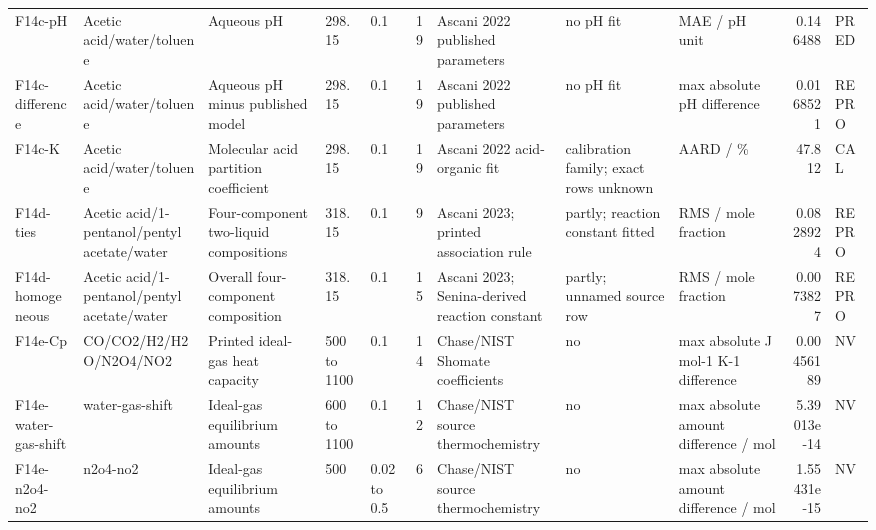 \begin{landscape}
\begin{longtable}{L{1.9cm}L{2.5cm}L{2.1cm}L{1.6cm}L{1.6cm}rL{2.4cm}L{1.9cm}L{2.2cm}rL{1cm}}
F14c-\allowbreak{}pH & Acetic acid/\allowbreak{}water/\allowbreak{}toluene & Aqueous pH & 298.15 & 0.1 & 19 & Ascani 2022 published parameters & no pH fit & MAE /\allowbreak{} pH unit & 0.146488 & PRED \\
F14c-\allowbreak{}difference & Acetic acid/\allowbreak{}water/\allowbreak{}toluene & Aqueous pH minus published model & 298.15 & 0.1 & 19 & Ascani 2022 published parameters & no pH fit & max absolute pH difference & 0.0168521 & REPRO \\
F14c-\allowbreak{}K & Acetic acid/\allowbreak{}water/\allowbreak{}toluene & Molecular acid partition coefficient & 298.15 & 0.1 & 19 & Ascani 2022 acid-\allowbreak{}organic fit & calibration family; exact rows unknown & AARD /\allowbreak{} \% & 47.812 & CAL \\
F14d-\allowbreak{}ties & Acetic acid/\allowbreak{}1-\allowbreak{}pentanol/\allowbreak{}pentyl acetate/\allowbreak{}water & Four-\allowbreak{}component two-\allowbreak{}liquid compositions & 318.15 & 0.1 & 9 & Ascani 2023; printed association rule & partly; reaction constant fitted & RMS /\allowbreak{} mole fraction & 0.0828924 & REPRO \\
F14d-\allowbreak{}homogeneous & Acetic acid/\allowbreak{}1-\allowbreak{}pentanol/\allowbreak{}pentyl acetate/\allowbreak{}water & Overall four-\allowbreak{}component composition & 318.15 & 0.1 & 15 & Ascani 2023; Senina-\allowbreak{}derived reaction constant & partly; unnamed source row & RMS /\allowbreak{} mole fraction & 0.0073827 & REPRO \\
F14e-\allowbreak{}Cp & CO/\allowbreak{}CO2/\allowbreak{}H2/\allowbreak{}H2O/\allowbreak{}N2O4/\allowbreak{}NO2 & Printed ideal-\allowbreak{}gas heat capacity & 500 to 1100 & 0.1 & 14 & Chase/\allowbreak{}NIST Shomate coefficients & no & max absolute J mol-\allowbreak{}1 K-\allowbreak{}1 difference & 0.00456189 & NV \\
F14e-\allowbreak{}water-\allowbreak{}gas-\allowbreak{}shift & water-\allowbreak{}gas-\allowbreak{}shift & Ideal-\allowbreak{}gas equilibrium amounts & 600 to 1100 & 0.1 & 12 & Chase/\allowbreak{}NIST source thermochemistry & no & max absolute amount difference /\allowbreak{} mol & 5.39013e-\allowbreak{}14 & NV \\
F14e-\allowbreak{}n2o4-\allowbreak{}no2 & n2o4-\allowbreak{}no2 & Ideal-\allowbreak{}gas equilibrium amounts & 500 & 0.02 to 0.5 & 6 & Chase/\allowbreak{}NIST source thermochemistry & no & max absolute amount difference /\allowbreak{} mol & 1.55431e-\allowbreak{}15 & NV \\

\end{longtable}
\end{landscape}

